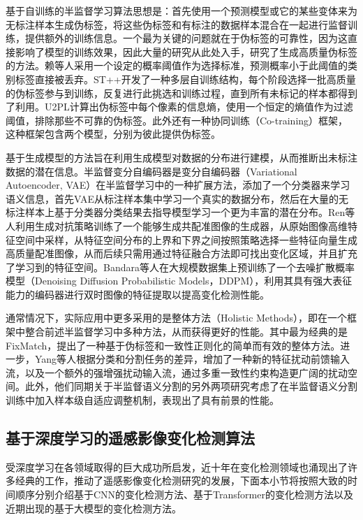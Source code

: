 \documentclass[lang=chs, degree=master, blindreview=false, adobe=false]{yanputhesis}
\begin{document}
基于自训练的半监督学习算法思想是：首先使用一个预测模型或它的某些变体来为无标注样本生成伪标签，将这些伪标签和有标注的数据样本混合在一起进行监督训练，提供额外的训练信息。一个最为关键的问题就在于伪标签的可靠性，因为这直接影响了模型的训练效果，因此大量的研究从此处入手，研究了生成高质量伪标签的方法。赖等人\cite{Lai2021CAC}采用一个设定的概率阈值作为选择标准，预测概率小于此阈值的类别标签直接被丢弃。ST++\cite{yang2022st++}开发了一种多层自训练结构，每个阶段选择一批高质量的伪标签参与到训练，反复进行此挑选和训练过程，直到所有未标记的样本都得到了利用。U2PL\cite{wang2022u2pl}计算出伪标签中每个像素的信息熵，使用一个恒定的熵值作为过滤阈值，排除那些不可靠的伪标签。此外还有一种协同训练（Co-training）框架\cite{co-training}，这种框架包含两个模型，分别为彼此提供伪标签。

基于生成模型的方法旨在利用生成模型对数据的分布进行建模，从而推断出未标注数据的潜在信息。半监督变分自编码器\cite{semiVAE}是变分自编码器（Variational Autoencoder, VAE）在半监督学习中的一种扩展方法，添加了一个分类器来学习语义信息，首先VAE从标注样本集中学习一个真实的数据分布，然后在大量的无标注样本上基于分类器分类结果去指导模型学习一个更为丰富的潜在分布。Ren等人\cite{gen_sample_TGRS21}利用生成对抗策略训练了一个能够生成共配准图像的生成器，从原始图像高维特征空间中采样，从特征空间分布的上界和下界之间按照策略选择一些特征向量生成高质量配准图像，从而后续只需用通过特征融合方法即可找出变化区域，并且扩充了学习到的特征空间。Bandara等人\cite{bandara2022ddpm}在大规模数据集上预训练了一个去噪扩散概率模型（Denoising Diffusion Probabilistic Models，DDPM），利用其具有强大表征能力的编码器进行双时图像的特征提取以提高变化检测性能。

通常情况下，实际应用中更多采用的是整体方法（Holistic Methods），即在一个框架中整合前述半监督学习中多种方法，从而获得更好的性能。其中最为经典的是FixMatch\cite{sohn2020fixmatch}，提出了一种基于伪标签和一致性正则化的简单而有效的整体方法。进一步，Yang等人\cite{UniMatch}根据分类和分割任务的差异，增加了一种新的特征扰动前馈输入流，以及一个额外的强增强扰动输入流，通过多重一致性约束构造更广阔的扰动空间。此外，他们同期关于半监督语义分割的另外两项研究\cite{AugSeg}\cite{iMAS}考虑了在半监督语义分割训练中加入样本级自适应调整机制，表现出了具有前景的性能。

\subsection{基于深度学习的遥感影像变化检测算法}
受深度学习在各领域取得的巨大成功所启发，近十年在变化检测领域也涌现出了许多经典的工作，推动了遥感影像变化检测研究的发展，下面本小节将按照大致的时间顺序分别介绍基于CNN的变化检测方法、基于Transformer的变化检测方法以及近期出现的基于大模型的变化检测方法。
\end{document}
